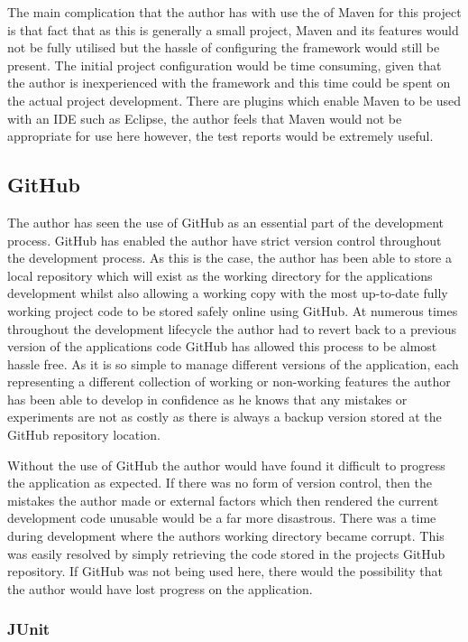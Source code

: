 The main complication that the author has with use the of Maven for this project is that fact that as this is generally a small project, Maven and its features would not be fully utilised but the hassle of configuring the framework would still be present. The initial project configuration would be time consuming, given that the author is inexperienced with the framework and this time could be spent on the actual project development. There are plugins which enable Maven to be used with an IDE such as Eclipse, the author feels that Maven would not be appropriate for use here however, the test reports would be extremely useful.

\subsection{GitHub}

The author has seen the use of GitHub as an essential part of the development process. GitHub has enabled the author have strict version control throughout the development process. As this is the case, the author has been able to store a local repository which will exist as the working directory for the applications development whilst also allowing a working copy with the most up-to-date fully working project code to be stored safely online using GitHub. At numerous times throughout the development lifecycle the author had to revert back to a previous version of the applications code GitHub has allowed this process to be almost hassle free. As it is so simple to manage different versions of the application, each representing a different collection of working or non-working features the author has been able to develop in confidence as he knows that any mistakes or experiments are not as costly as there is always a backup version stored at the GitHub repository location.

Without the use of GitHub the author would have found it difficult to progress the application as expected. If there was no form of version control, then the mistakes the author made or external factors which then rendered the current development code unusable would be a far more disastrous. There was a time during development where the authors working directory became corrupt. This was easily resolved by simply retrieving the code stored in the projects GitHub repository. If GitHub was not being used here, there would the possibility that the author would have lost progress on the application.

\subsubsection{JUnit}
\label{junitsupport}

